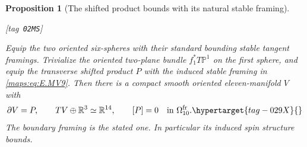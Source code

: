 \documentclass[11pt,a4paper]{article}
\makeatletter
\numberwithin{equation}{section}
\newtheorem{proposition}[proposition]{Proposition}
\theoremstyle{definition}
\newcommand{\StatementRecord}[4]{{\upshape\footnotesize[tag~\texttt{#3}]}\enspace\ignorespaces}
\newcommand{\SeriesRefText}[1]{\ifcsname SRef@#1\endcsname\csname SRef@#1\endcsname\else\textbf{UNRESOLVED}\fi}
\newcommand{\SeriesRef}[1]{\ifmmode\text{\SeriesRefText{#1}}\else\SeriesRefText{#1}\fi}
\makeatother
\begin{document}
\begin{proposition}[The shifted product bounds with its natural stable framing]\hypertarget{tag-02MS}{}\label{maps:src:E.2.8}
\StatementRecord{maps:src:E.2.8}{proved}{02MS}{\eqref{maps:eq:E.MV9}, \SeriesRef{maps:src:B.2.1}, \eqref{maps:eq:E.B2}, \cref{maps:src:E.2.7}, \cref{maps:src:E.2.9}; \cite[Chapter 3, Section 2, Theorems 2.1 and 2.5]{rootHirsch76}}


Equip the two oriented six-spheres with their standard bounding
stable tangent framings. Trivialize the oriented two-plane bundle
$f_1^*T\mathbb P^1$ on the first sphere, and equip the transverse
shifted product $P$ with the induced stable framing in \eqref{maps:eq:E.MV9}.
Then there is a compact smooth oriented eleven-manifold $V$ with
\begin{equation}
 \partial V=P,\qquad TV\oplus\mathbb R^3\simeq\mathbb R^{14},
 \qquad [P]=0\quad\hbox{in }\Omega^{\mathrm{fr}}_{10}.
 \hypertarget{tag-029X}{}\label{maps:eq:E.B1}
\end{equation}
The boundary framing is the stated one. In particular its induced
spin structure bounds. 
\end{proposition}
\end{document}
